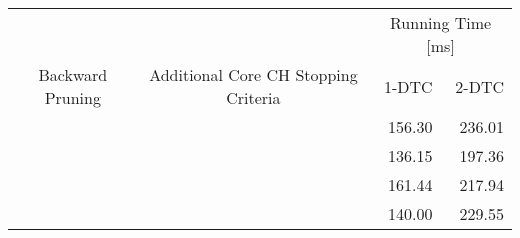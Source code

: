\begin{tabular}{ccrr}
	\toprule
	                 &                                      & \multicolumn{2}{c}{Running Time [\si{\milli\second}]}         \\
	Backward Pruning & Additional Core CH Stopping Criteria & 1-DTC                                                 & 2-DTC \\
	\midrule
	\xmark           & \xmark                               & 156.30                                                     & 236.01     \\
	\cmark           & \xmark                               & 136.15                                                     & 197.36     \\
	\xmark           & \cmark                               & 161.44                                                     & 217.94     \\
	\cmark           & \cmark                               & 140.00                                                     & 229.55     \\
	\bottomrule
\end{tabular}